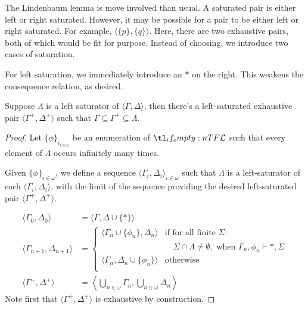 \documentclass[10pt]{article}
\begin{document}
The Lindenbaum lemma is move involved than usual.
A saturated pair is either left or right saturated.
However, it may be possible for a pair to be either left or right saturated.
For example, \(\langle \{p\}, \{q\} \rangle\).
Here, there are two exhaustive pairs, both of which would be fit for purpose.
Instead of choosing, we introduce two cases of saturation.



For left saturation, we immediately introduce an \(\ast\) on the right.
This weakens the consequence relation, as desired.

\begin{lemma}\label{lindenbaum:left}
  Suppose \(\Lambda\) is a left saturator of \(\langle \Gamma, \Delta \rangle\), then there's a left-saturated exhaustive pair \(\langle \Gamma^{+},\Delta^{+} \rangle\) such that \(\Gamma \subseteq \Gamma^{+} \subseteq \Lambda\).


  \begin{proof}
    Let \(\{\phi\}_{i_{i \in \omega}}\) be an enumeration of \(\olang{}\) such that every element of \(\Lambda\) occurs infinitely many times.\nolinebreak

    Given \(\{\phi\}_{i \in \omega}\), we define a sequence \(\langle \Gamma_{i}, \Delta_{i} \rangle_{i \in \omega}\) such that \(\Lambda\) is a left-saturator of each \(\langle \Gamma_{i},\Delta_{i} \rangle\), with the limit of the sequence providing the desired left-saturated pair \(\langle \Gamma^{+},\Delta^{+} \rangle\).

    \begin{align*}
      \langle \Gamma_{0},\Delta_{0} \rangle &= \langle \Gamma,\Delta \cup \{\ast\} \rangle \\
      \langle \Gamma_{n+1},\Delta_{n+1} \rangle &=
                                                  \begin{cases}
                                                    \langle \Gamma_{n} \cup \{\phi_{n}\}, \Delta_{n} \rangle &\text{if for all finite } \Sigma \colon  \\
                                                    &\quad \Sigma \cap \Lambda \ne \emptyset, \text{ when } \Gamma_{n},\phi_{n} \vdash \ast, \Sigma \\
                                                    \langle \Gamma_{n},\Delta_{n} \cup \{\phi_{n}\} \rangle &\text{otherwise} \\
                                                  \end{cases}
      \\
      \langle \Gamma^{+},\Delta^{+} \rangle &= \left\langle \bigcup_{n \in \omega}\Gamma_{n}, \bigcup_{n\in\omega}\Delta_{n} \right\rangle
    \end{align*}
    Note first that \(\langle \Gamma^{+}, \Delta^{+} \rangle\) is exhaustive by construction.


\end{proof}
\end{lemma}
\end{document}
